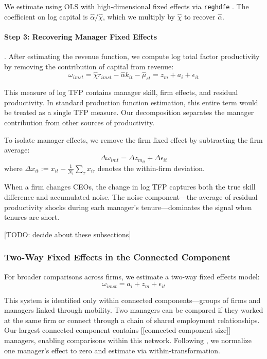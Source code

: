 \documentclass[11pt,a4paper]{article}
\begin{document}
We estimate using OLS with high-dimensional fixed effects via \texttt{reghdfe} \citep{reghdfe}. The coefficient on log capital is $\hat{\alpha}/\hat{\chi}$, which we multiply by $\hat{\chi}$ to recover $\hat{\alpha}$.

\paragraph{Step 3: Recovering Manager Fixed Effects}. After estimating the revenue function, we compute log total factor productivity by removing the contribution of capital from revenue:
\begin{equation}
\omega_{imst} = \hat{\chi} r_{imst} - \hat{\alpha} k_{it} - \hat{\mu}_{st} = z_m + a_i + \epsilon_{it}
\end{equation}

This measure of log TFP contains manager skill, firm effects, and residual productivity. In standard production function estimation, this entire term would be treated as a single TFP measure. Our decomposition separates the manager contribution from other sources of productivity.

To isolate manager effects, we remove the firm fixed effect by subtracting the firm average:
\begin{equation}
\Delta\omega_{imt} = \Delta z_{m_{it}} + \Delta\epsilon_{it}
\end{equation}
where $\Delta x_{it} := x_{it} - \frac{1}{N_i}\sum_{\tau} x_{i\tau}$ denotes the within-firm deviation.

When a firm changes CEOs, the change in log TFP captures both the true skill difference and accumulated noise. The noise component—the average of residual productivity shocks during each manager's tenure—dominates the signal when tenures are short.

[TODO: decide about these subsections]

\subsubsection{Two-Way Fixed Effects in the Connected Component}

For broader comparisons across firms, we estimate a two-way fixed effects model:
\begin{equation}
\omega_{imst} = a_i + z_m + \epsilon_{it}
\end{equation}

This system is identified only within connected components—groups of firms and managers linked through mobility. Two managers can be compared if they worked at the same firm or connect through a chain of shared employment relationships. Our largest connected component contains [[connected component size]] managers, enabling comparisons within this network. Following \citet{Abowd1999Econometrica}, we normalize one manager's effect to zero and estimate via within-transformation.
\end{document}
